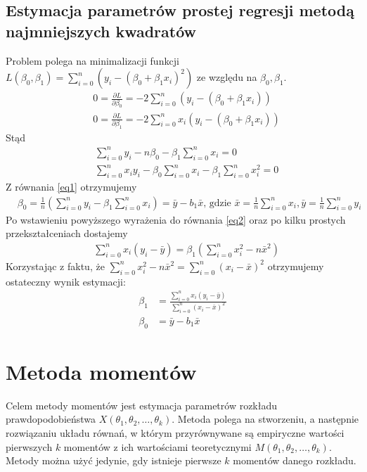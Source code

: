 \documentclass[inzynierska]{pwr_wmat_praca_dyplomowa}
\theoremstyle{plain}
\numberwithin{theorem}{chapter}
\theoremstyle{definition}
\numberwithin{theorem}{chapter}
\begin{document}
\subsection{Estymacja parametrów prostej regresji metodą najmniejszych kwadratów}
Problem polega na minimalizacji funkcji $L(\beta_0, \beta_1) = \sum_{i=0}^{n}\left(y_i - \left(\beta_0 + \beta_1 x_i\right)^2 \right)$ ze względu na $\beta_0, \beta_1$.
\begin{align}
	& 0 = \frac{\partial L}{\partial \beta_0} = -2\sum_{i=0}^{n}\left(y_i - \left(\beta_0 + \beta_1 x_i\right)\right) \\
	& 0 = \frac{\partial L}{\partial \beta_1} = -2\sum_{i=0}^{n}x_i\left(y_i - \left(\beta_0 + \beta_1 x_i\right)\right)
\end{align}
Stąd
\begin{align}
	& \sum_{i=0}^{n}y_i - n \beta_0 - \beta_1\sum_{i=0}^{n} x_i = 0 \label{eq1}\\
	& \sum_{i=0}^{n} x_i y_i - \beta_0 \sum_{i=0}^{n}x_i - \beta_1\sum_{i=0}^{n} x_i^2 = 0 \label{eq2}
\end{align}
Z równania \ref{eq1} otrzymujemy
\begin{align}	
	& \beta_0 = \frac{1}{n} \left(\sum_{i=0}^{n}y_i - \beta_1\sum_{i=0}^{n} x_i\right) = \bar{y} - b_1 \bar{x}\text{, gdzie } \bar{x}= \frac{1}{n}\sum_{i=0}^{n} x_i, \bar{y}= \frac{1}{n}\sum_{i=0}^{n} y_i
\end{align}
Po wstawieniu powyższego wyrażenia do równania \ref{eq2} oraz po kilku prostych przekształceniach dostajemy
\begin{align}
	& \sum_{i=0}^{n}x_i(y_i - \bar{y}) = \beta_1 \left(\sum_{i=0}^{n}x_i^2 - n\bar{x}^2 \right)
\end{align}
Korzystając z faktu, że $\sum_{i=0}^{n}x_i^2 - n\bar{x}^2 = \sum_{i=0}^{n}(x_i-\bar{x})^2$ otrzymujemy ostateczny wynik estymacji:
\begin{align}
	\beta_1& =  \frac{\sum_{i=0}^{n}x_i(y_i - \bar{y})}{\sum_{i=0}^{n}(x_i-\bar{x})^2}\\
	\beta_0& =  \bar{y} - b_1\bar{x}
\end{align}
\section{Metoda momentów}
Celem metody momentów \cite{momentowametoda} jest estymacja parametrów rozkładu prawdopodobieństwa $X(\theta_1, \theta_2, \dots, \theta_k)$. Metoda polega na stworzeniu, a następnie rozwiązaniu układu równań, w którym przyrównywane są empiryczne wartości pierwszych $k$ momentów z ich wartościami teoretycznymi $M(\theta_1, \theta_2, \dots, \theta_k)$. Metody można użyć jedynie, gdy istnieje pierwsze $k$ momentów danego rozkładu.
\end{document}

